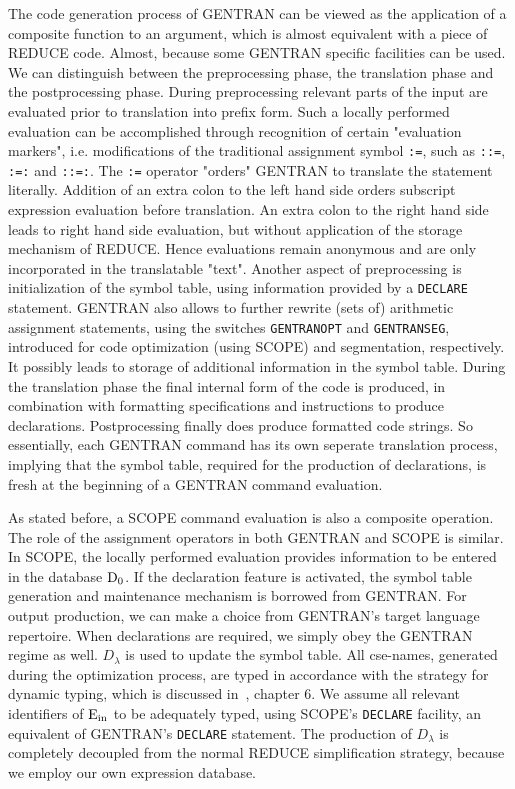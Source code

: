 The code generation process of GENTRAN can be viewed as the application
of a composite function to an argument, which is almost equivalent with a 
piece of REDUCE code. Almost, because some GENTRAN specific facilities 
can be used. We can distinguish between the preprocessing phase, 
the translation phase and the postprocessing phase.
During preprocessing relevant parts of the input are evaluated prior to 
translation into prefix form. Such a locally performed evaluation can be 
accomplished through recognition of certain "evaluation markers", i.e. 
modifications of the traditional assignment symbol {\tt :=}, 
such as {\tt ::=}, {\tt :=:} and {\tt ::=:}. The {\tt :=} operator
"orders" GENTRAN to translate the statement literally. Addition of an extra 
colon to the left hand side orders subscript expression evaluation before
translation. An extra colon to the right hand side leads to right hand side 
evaluation, but without application of the storage mechanism of REDUCE. 
Hence evaluations
remain anonymous and are only incorporated in the translatable "text".
Another aspect of preprocessing is initialization of the symbol table, 
using information provided by a {\tt DECLARE} statement.
GENTRAN also allows to further rewrite (sets of) arithmetic assignment
statements, using the switches {\tt GENTRANOPT} and {\tt GENTRANSEG}, 
introduced for code optimization (using SCOPE) and segmentation, respectively. 
It possibly leads to storage of additional information in the symbol table.
During the translation phase the final internal form
of the code is produced, in combination with formatting specifications and
instructions to produce declarations.
Postprocessing finally does produce formatted code strings. So essentially,
each GENTRAN command has its own seperate translation process, implying that
the symbol table, required for the production of declarations, is fresh
at the beginning of a GENTRAN command evaluation.

As stated before, a SCOPE command evaluation is also a composite operation. 
The role of the assignment operators in both GENTRAN and SCOPE is similar.
In SCOPE, the locally performed evaluation provides
information to be entered in the database ${\rm D_0}$.
If the declaration feature is activated, the symbol table generation and 
maintenance mechanism is borrowed from GENTRAN. 
For output production, we can make a choice from 
GENTRAN's target language repertoire. When declarations are required, we simply 
obey the GENTRAN regime as well. ${D_{\lambda}}$ is used to update the symbol 
table. All cse-names, generated during the optimization process, are typed in 
accordance with the strategy for dynamic typing, which is discussed 
in~\cite{Aho:86}, chapter 6. We assume all relevant identifiers 
of ${\rm E_{in}}$ to be adequately typed, using SCOPE's {\tt DECLARE} facility,
an equivalent of GENTRAN's {\tt DECLARE} statement. The
production of ${D_{\lambda}}$ is completely decoupled from the normal
REDUCE simplification strategy, because we employ our own expression database.

